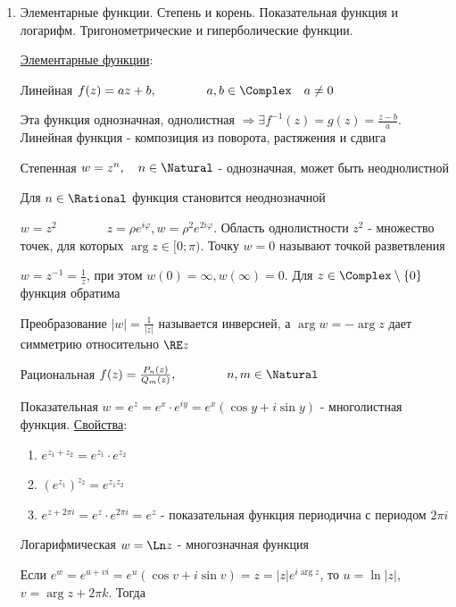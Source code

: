 \documentclass[12pt]{article}
\begin{document}
\begin{enumerate}
    На языке приращений: $\Delta f = f(z_0 + \Delta z) - f(z_0) \underset{\Delta z \to 0}{\longrightarrow} 0$

    \item Элементарные функции. Степень и корень. Показательная функция и логарифм. Тригонометрические и гиперболические функции.

    \hyperlink{elementary_functions}{Элементарные функции}:

     Линейная $f(z) = az + b, \qquad\qquad a, b \in \Complex \quad a \neq 0$

    Эта функция однозначная, однолистная $\Longrightarrow \exists f^{-1}(z) = g(z) = \frac{z - b}{a}$. 
    Линейная функция - композиция из поворота, растяжения и сдвига
    
     Степенная $w = z^n, \quad n \in \Natural$ - однозначная, может быть неоднолистной
    
    Для $n \in \Rational$ функция становится неоднозначной
    
    \Exs $w = z^2 \qquad\qquad z = \rho e^{i\varphi}, w = \rho^2 e^{2i\varphi}$. Область однолистности $z^2$ - множество точек, для которых $\arg z \in [0; \pi)$.
    Точку $w = 0$ называют точкой разветвления
    
    \Exs $w = z^{-1} = \frac{1}{z}$, при этом $w(0) = \infty, w(\infty) = 0$.    
    Для $z \in \Complex \setminus \{0\}$ функция обратима
    
    Преобразование $|w| = \frac{1}{|z|}$ называется инверсией, а $\arg w = -\arg z$ дает симметрию относительно $\RE z$
    
     Рациональная $f(z) = \frac{P_n(z)}{Q_m(z)}, \qquad\qquad n, m \in \Natural$
    
     Показательная $w = e^z = e^x \cdot e^{iy} = e^x (\cos y + i \sin y)$ - многолистная функция. \underline{Свойства}: 
    
    \begin{enumerate}
        \item $e^{z_1 + z_2} = e^{z_1} \cdot e^{z_2}$
        \item $\left(e^{z_1}\right)^{z_2} = e^{z_1 z_2}$
        \item $e^{z + 2\pi i} = e^{z} \cdot e^{2\pi i} = e^z$ - показательная функция периодична с периодом $2\pi i$
    \end{enumerate}
    
     Логарифмическая $w = \Ln z$ - многозначная функция
    
    Если $e^w = e^{u + vi} = e^u (\cos v + i \sin v) = z = |z| e^{i\arg z}$, то $u = \ln |z|$, $v = \arg z + 2\pi k$. Тогда 
    

\end{enumerate}
\end{document}

